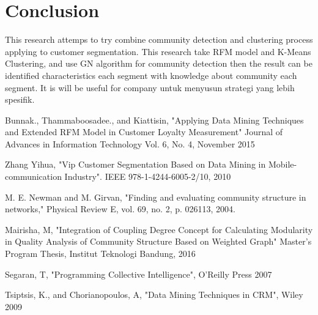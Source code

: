 \documentclass[conference]{IEEEtran}
\begin{document}
\section{Conclusion}
This research attemps to try combine community detection and clustering process applying to customer segmentation. This research take RFM model and K-Means Clustering, and use GN algorithm for community detection then the result can be identified characteristics each segment with knowledge about community each segment. It is will be useful for company untuk menyusun strategi yang lebih spesifik.






\begin{thebibliography}{1}

Bunnak., Thammaboosadee., and Kiattisin, "Applying Data Mining Techniques
and Extended RFM Model in Customer Loyalty Measurement" Journal of
Advances in Information Technology Vol. 6, No. 4, November 2015

Zhang Yihua, "Vip Customer Segmentation Based on Data Mining in
Mobile-communication Industry". IEEE 978-1-4244-6005-2/10, 2010

M. E. Newman and M. Girvan, "Finding and evaluating
community structure in networks," Physical Review E,
vol. 69, no. 2, p. 026113, 2004.

Mairisha, M, "Integration of Coupling Degree Concept for Calculating Modularity in Quality Analysis of
Community Structure Based on Weighted Graph" Master’s Program Thesis, Institut Teknologi Bandung, 2016

Segaran, T, "Programming Collective Intelligence", O'Reilly Press 2007

Tsiptsis, K., and Chorianopoulos, A, "Data Mining Techniques in CRM", Wiley 2009
\end{thebibliography}




\end{document}
